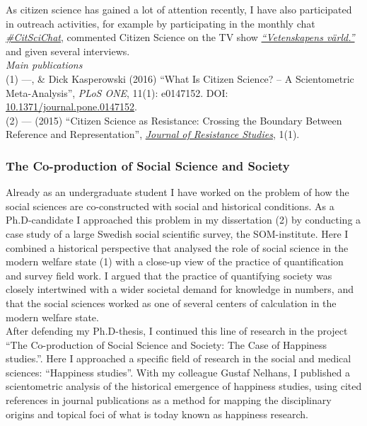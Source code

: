 \documentclass[a4paper,11pt,oneside]{article}
\begin{document}
    As citizen science has gained a lot of attention recently, I have also participated in
    outreach activities, for example by participating in the monthly chat
    \emph{\href{http://blogs.plos.org/citizensci/2016/05/17/coops-scoop-citizen-science-practitioners-walk-the-walk-with-open-science-on-the-next-citscichat/}{#CitSciChat}},
    commented Citizen Science on the TV show \emph{\href{https://youtu.be/vG8sZQnU7mU?t=18m1s}{``Vetenskapens värld.''}} and
    given several interviews. \\


      \noindent  \emph{Main publications} \\
      (1) ---, \& Dick Kasperowski (2016) ``What Is Citizen Science? – A Scientometric Meta-Analysis'', \emph{PLoS ONE}, 11(1): e0147152. DOI: \href{http://dx.doi.org/10.1371/journal.pone.0147152}{10.1371/journal.pone.0147152}.\\
      (2) --- (2015) ``Citizen Science as Resistance: Crossing the Boundary Between Reference and Representation'', \href{https://gup.ub.gu.se/publication/218601-citizen-science-as-resistance-crossing-the-boundary-between-reference-and-representation}{\emph{Journal of Resistance Studies}}, 1(1).\\

    \subsubsection{The Co-production of Social Science and Society}
    Already as an undergraduate student I have worked on the problem of how the
    social sciences are co-constructed with social and historical conditions. As a
    Ph.D-candidate I approached this problem in my dissertation (2) by conducting a
    case study of a large Swedish social scientific survey, the SOM-institute. Here I
    combined a historical perspective that analysed the role of social science in the
    modern welfare state (1) with a close-up view of the practice of quantification and
    survey field work. I argued that the practice of quantifying society was closely
    intertwined with a wider societal demand for knowledge in numbers, and that the social
    sciences worked as one of several centers of calculation in the modern welfare state.\\

    After defending my Ph.D-thesis, I continued this line of research in the project
    ``The Co-production of Social Science and Society: The Case of Happiness studies.''.
    Here I approached a specific field of research in the social and medical sciences:
    ``Happiness studies''. With my colleague Gustaf Nelhans, I published a scientometric analysis
    of the historical emergence of happiness studies, using cited references in journal
    publications as a method for mapping the disciplinary origins and topical foci of
    what is today known as happiness research. \\
\end{document}

